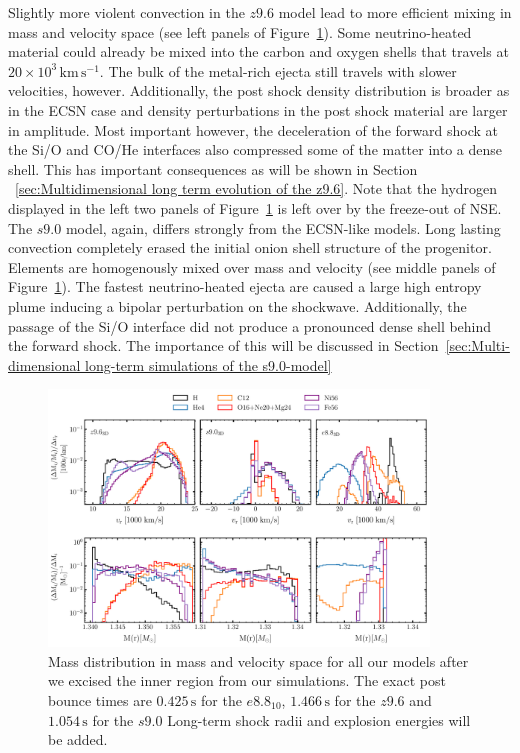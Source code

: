 \documentclass[fleqn,usenatbib]{mnras}
\newcommand{\kms}{\ensuremath{\mathrm{km\, s^{-1}}}\xspace}
\newcommand{\COM}[1]{{\color{orange}#1}}
\begin{document}
Slightly more violent convection in the $z9.6$ model lead to more efficient mixing in mass and velocity space (see left panels of Figure~\ref{fig:mdp first mapping}). Some neutrino-heated material could already be mixed into the carbon and oxygen shells that travels at $20\times 10^3\,\kms$. The bulk of the metal-rich ejecta still travels with slower velocities, however. 
Additionally, the post shock density distribution is broader as in the ECSN case and density perturbations in the post shock material are larger in amplitude. Most important however, the deceleration of the forward shock at the Si/O and CO/He interfaces also compressed some of the matter into a dense shell. This has important consequences as will be shown in Section ~\ref{sec:Multidimensional long term evolution of the z9.6}.
Note that the hydrogen displayed in the left two panels of Figure~\ref{fig:mdp first mapping} is left over by the freeze-out of NSE. 
The $s9.0$ model, again, differs strongly from the ECSN-like models. 
Long lasting convection completely erased the initial onion shell structure of the progenitor. Elements are homogenously mixed over mass and velocity (see middle panels of Figure~\ref{fig:mdp first mapping}).
The fastest neutrino-heated ejecta are caused a large high entropy plume inducing a bipolar perturbation on the shockwave.
Additionally, the passage of the Si/O interface did not produce a pronounced dense shell behind the forward shock. The importance of this will be discussed in Section~\ref{sec:Multi-dimensional long-term simulations of the s9.0-model}


\begin{figure}
 \centering
 \includegraphics[width=0.9\textwidth]{pic/z96_s9_e8_3d_massDis_mvr_and_masstime_0.pdf}
 \caption{Mass distribution in mass and velocity space for all our models after we excised the inner region from our simulations. The exact post bounce times are $0.425 \,\text{s}$ for the $e8.8_{10}$, $1.466 \,\text{s}$ for the $z9.6$ and $1.054 \,\text{s}$ for the $s9.0$ \COM{Long-term shock radii and explosion energies will be added.} }
 \label{fig:mdp first mapping}
\end{figure}
\end{document}
